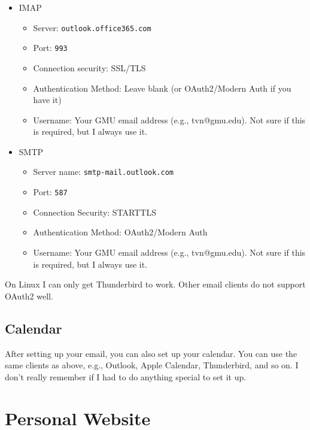 \documentclass[oneside,11pt,dvipsnames]{book}
\newenvironment{commentbox}[1][]{
  \small
  \begin{marker}[\faChessPawn{}]
    {\textbf{#1}}
  }{
  \end{marker}
}
\begin{document}
\begin{itemize}
  \item IMAP
  \begin{itemize}
    \item Server: \texttt{outlook.office365.com}
    \item Port: \texttt{993}
    \item Connection security: SSL/TLS
    \item Authentication Method: Leave blank (or OAuth2/Modern Auth if you have it)
    \item Username: Your GMU email address (e.g., tvn@gmu.edu).  Not sure if this is required, but I always use it.
  \end{itemize}
  \item SMTP 
  \begin{itemize}
    \item Server name: \texttt{smtp-mail.outlook.com}
  \item Port: \texttt{587}
  \item Connection Security: STARTTLS
  \item Authentication Method: OAuth2/Modern Auth
  \item Username: Your GMU email address (e.g., tvn@gmu.edu).  Not sure if this is required, but I always use it.
  \end{itemize}
\end{itemize}

\begin{commentbox}
On Linux I can only get Thunderbird to work.  Other email clients do not support OAuth2 well. 
\end{commentbox}

\section{Calendar}
After setting up your email, you can also set up your calendar.  You can use the same clients as above, e.g., Outlook, Apple Calendar, Thunderbird, and so on.  I don't really remember if I had to do anything special to set it up.



\chapter{Personal Website}
\end{document}
